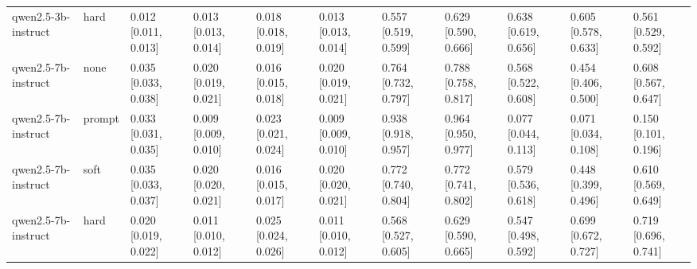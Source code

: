 \begin{tabular}{lllllllllll}
qwen2.5-3b-instruct & hard & 0.012 [0.011, 0.013] & 0.013 [0.013, 0.014] & 0.018 [0.018, 0.019] & 0.013 [0.013, 0.014] & 0.557 [0.519, 0.599] & 0.629 [0.590, 0.666] & 0.638 [0.619, 0.656] & 0.605 [0.578, 0.633] & 0.561 [0.529, 0.592] \\
qwen2.5-7b-instruct & none & 0.035 [0.033, 0.038] & 0.020 [0.019, 0.021] & 0.016 [0.015, 0.018] & 0.020 [0.019, 0.021] & 0.764 [0.732, 0.797] & 0.788 [0.758, 0.817] & 0.568 [0.522, 0.608] & 0.454 [0.406, 0.500] & 0.608 [0.567, 0.647] \\
qwen2.5-7b-instruct & prompt & 0.033 [0.031, 0.035] & 0.009 [0.009, 0.010] & 0.023 [0.021, 0.024] & 0.009 [0.009, 0.010] & 0.938 [0.918, 0.957] & 0.964 [0.950, 0.977] & 0.077 [0.044, 0.113] & 0.071 [0.034, 0.108] & 0.150 [0.101, 0.196] \\
qwen2.5-7b-instruct & soft & 0.035 [0.033, 0.037] & 0.020 [0.020, 0.021] & 0.016 [0.015, 0.017] & 0.020 [0.020, 0.021] & 0.772 [0.740, 0.804] & 0.772 [0.741, 0.802] & 0.579 [0.536, 0.618] & 0.448 [0.399, 0.496] & 0.610 [0.569, 0.649] \\
qwen2.5-7b-instruct & hard & 0.020 [0.019, 0.022] & 0.011 [0.010, 0.012] & 0.025 [0.024, 0.026] & 0.011 [0.010, 0.012] & 0.568 [0.527, 0.605] & 0.629 [0.590, 0.665] & 0.547 [0.498, 0.592] & 0.699 [0.672, 0.727] & 0.719 [0.696, 0.741] \\
\bottomrule
\end{tabular}
